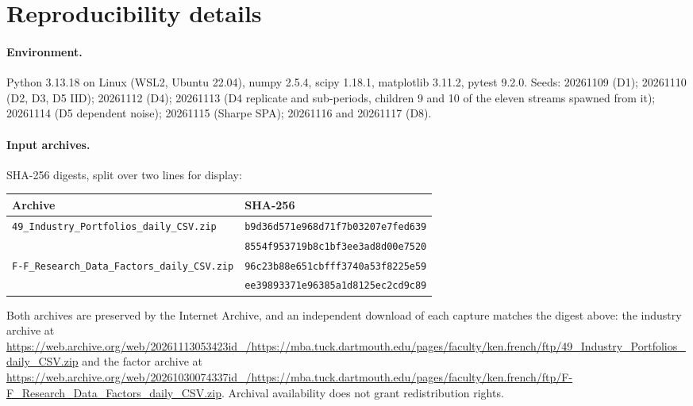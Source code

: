 \documentclass[11pt,a4paper]{article}
\begin{document}
\FloatBarrier
\section{Reproducibility details}\label{app:repro}

\paragraph{Environment.} Python 3.13.18 on Linux (WSL2, Ubuntu 22.04), numpy 2.5.4, scipy 1.18.1, matplotlib 3.11.2, pytest 9.2.0. Seeds: 20261109 (D1); 20261110 (D2, D3, D5 IID); 20261112 (D4); 20261113 (D4 replicate and sub-periods, children 9 and 10 of the eleven streams spawned from it); 20261114 (D5 dependent noise); 20261115 (Sharpe SPA); 20261116 and 20261117 (D8).

\paragraph{Input archives.} SHA-256 digests, split over two lines for display:
\begin{center}\scriptsize
\begin{tabular}{@{}ll@{}}
\toprule
Archive & SHA-256 \\
\midrule
\texttt{49\_Industry\_Portfolios\_daily\_CSV.zip} & \texttt{b9d36d571e968d71f7b03207e7fed639} \\
 & \texttt{8554f953719b8c1bf3ee3ad8d00e7520} \\
\texttt{F-F\_Research\_Data\_Factors\_daily\_CSV.zip} & \texttt{96c23b88e651cbfff3740a53f8225e59} \\
 & \texttt{ee39893371e96385a1d8125ec2cd9c89} \\
\bottomrule
\end{tabular}
\end{center}
Both archives are preserved by the Internet Archive, and an independent download of each capture matches the digest above: the industry archive at \url{https://web.archive.org/web/20261113053423id_/https://mba.tuck.dartmouth.edu/pages/faculty/ken.french/ftp/49_Industry_Portfolios_daily_CSV.zip} and the factor archive at \url{https://web.archive.org/web/20261030074337id_/https://mba.tuck.dartmouth.edu/pages/faculty/ken.french/ftp/F-F_Research_Data_Factors_daily_CSV.zip}. Archival availability does not grant redistribution rights.
\end{document}
